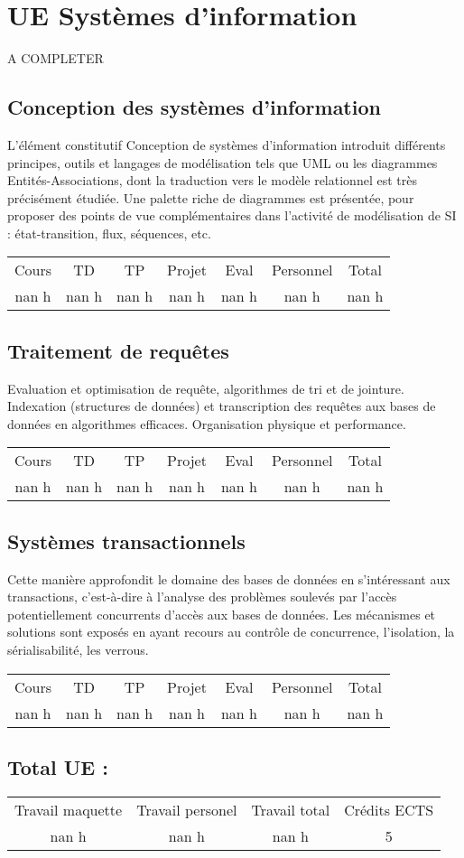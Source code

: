\section{UE Systèmes d'information}%
\label{sec:UESystmesdinformation}%
A COMPLETER%
\subsection{Conception des systèmes d'information}%
\label{subsec:Conceptiondessystmesdinformation}%

%
L’élément constitutif Conception de systèmes d’information introduit différents principes, outils et langages de modélisation tels que UML ou les diagrammes Entités{-}Associations, dont la traduction vers le modèle relationnel est très précisément étudiée. Une palette riche de diagrammes est présentée, pour proposer des points de vue complémentaires dans l’activité de modélisation de SI : état{-}transition, flux, séquences, etc.%
\begin{longtable}{c c c c c c c}%
\hline%
Cours&TD&TP&Projet&Eval&Personnel&Total\\%
nan h&nan h&nan h&nan h&nan h&nan h&nan h\\%
\hline%
\end{longtable}%
\subsection{Traitement de requêtes}%
\label{subsec:Traitementderequtes}%

%
Evaluation et optimisation de requête, algorithmes de tri et de jointure. Indexation (structures de données) et transcription des requêtes aux bases de données en algorithmes efficaces. Organisation physique et performance.%
\begin{longtable}{c c c c c c c}%
\hline%
Cours&TD&TP&Projet&Eval&Personnel&Total\\%
nan h&nan h&nan h&nan h&nan h&nan h&nan h\\%
\hline%
\end{longtable}%
\subsection{Systèmes transactionnels}%
\label{subsec:Systmestransactionnels}%

%
Cette manière approfondit le domaine des bases de données en s'intéressant aux transactions, c’est{-}à{-}dire à l'analyse des problèmes soulevés par l'accès potentiellement concurrents d'accès aux bases de données. Les mécanismes et solutions sont exposés en ayant recours au contrôle de concurrence, l'isolation, la sérialisabilité, les verrous.%
\begin{longtable}{c c c c c c c}%
\hline%
Cours&TD&TP&Projet&Eval&Personnel&Total\\%
nan h&nan h&nan h&nan h&nan h&nan h&nan h\\%
\hline%
\end{longtable}%
\subsection{Total UE :}%
\label{subsec:TotalUE}%

%
\begin{longtable}{c c c c}%
\hline%
Travail maquette&Travail personel&Travail total&Crédits ECTS\\%
nan h&nan h&nan h&5\\%
\hline%
\end{longtable}